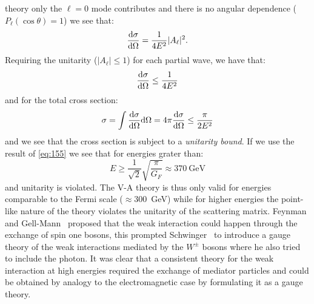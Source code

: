 theory only the $\ell = 0$ mode contributes and there is no angular dependence
($P_\ell(\cos \theta) = 1$) we see that:
\begin{equation}
  \label{eq:157}
  \frac{\mathrm{d} \sigma}{\mathrm{d} \Omega} = \frac{1}{4E^2} |A_\ell|^2.
\end{equation}
Requiring the unitarity ($|A_\ell| \leq 1$) for each partial wave, we have that:
\begin{equation}
  \label{eq:158}
  \frac{\mathrm{d} \sigma}{\mathrm{d} \Omega} \leq \frac{1}{4 E^2}
\end{equation}
and for the total cross section:
\begin{equation}
  \label{eq:159}
  \sigma = \int \frac{\mathrm{d} \sigma}{\mathrm{d} \Omega} \mathrm{d} \Omega = 4 \pi \frac{\mathrm{d}
    \sigma}{\mathrm{d} \Omega} \leq \frac{\pi}{2E^2}
\end{equation}
and we see that the cross section is subject to a \emph{unitarity bound}. If we
use the result of \cref{eq:155} we see that for energies grater than:
\begin{equation}
  \label{eq:160}
  E \geq \frac{1}{\sqrt{2}} \sqrt{\frac{\pi}{G_F}} \approx 370~\mathrm{GeV}
\end{equation}
and unitarity is violated. The V-A theory is thus only valid for energies
comparable to the Fermi scale ($\approx 300$~GeV) while for higher energies the
point-like nature of the theory violates the unitarity of the scattering
matrix. Feynman and Gell-Mann~\cite{FeynmannGellManFermiInteraction} proposed
that the weak interaction could happen through the exchange of spin one bosons,
this prompted Schwinger~\cite{SchwingerGaugeTheory} to introduce a gauge theory
of the weak interactions mediated by the $W^\pm$ bosons where he also tried to
include the photon. It was clear that a consistent theory for the weak
interaction at high energies required the exchange of mediator particles and
could be obtained by analogy to the electromagnetic case by formulating it as a
gauge theory.

